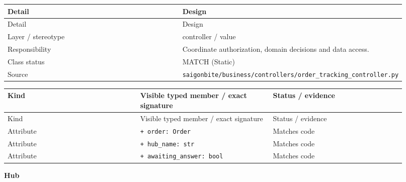 \begin{longtable}{>{\raggedright\arraybackslash}p{0.4600\linewidth}>{\raggedright\arraybackslash}p{0.4600\linewidth}}
Detail & Design \\
\hline\endfirsthead
Detail & Design \\
\hline\endhead
Layer / stereotype & controller / \guillemotleft{}value\guillemotright{} \\
Responsibility & Coordinate authorization, domain decisions and data access. \\
Class status & MATCH (Static) \\
Source & \texttt{saigonbite/\allowbreak{}business/\allowbreak{}controllers/\allowbreak{}order\_\allowbreak{}tracking\_\allowbreak{}controller.\allowbreak{}py} \\
\end{longtable}
\begin{longtable}{>{\raggedright\arraybackslash}p{0.3067\linewidth}>{\raggedright\arraybackslash}p{0.3067\linewidth}>{\raggedright\arraybackslash}p{0.3067\linewidth}}
Kind & Visible typed member / exact signature & Status / evidence \\
\hline\endfirsthead
Kind & Visible typed member / exact signature & Status / evidence \\
\hline\endhead
Attribute & \texttt{+ order: Order} & Matches code \\
Attribute & \texttt{+ hub\_\allowbreak{}name: str} & Matches code \\
Attribute & \texttt{+ awaiting\_\allowbreak{}answer: bool} & Matches code \\
\end{longtable}
\textbf{Hub}

